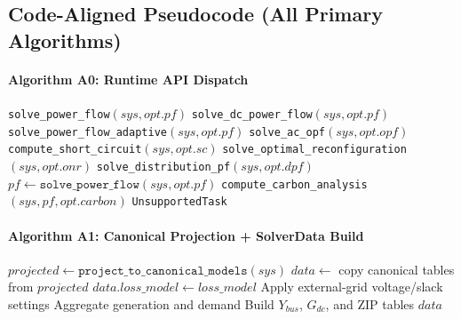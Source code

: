\subsection{Code-Aligned Pseudocode (All Primary Algorithms)}
\label{sec:algo-pseudocode}

\paragraph{Algorithm A0: Runtime API Dispatch}
\begin{algorithmic}[1]
    \State \Return \texttt{solve\_power\_flow}$(sys, opt.pf)$
    \State \Return \texttt{solve\_dc\_power\_flow}$(sys, opt.pf)$
    \State \Return \texttt{solve\_power\_flow\_adaptive}$(sys, opt.pf)$
    \State \Return \texttt{solve\_ac\_opf}$(sys, opt.opf)$
    \State \Return \texttt{compute\_short\_circuit}$(sys, opt.sc)$
    \State \Return \texttt{solve\_optimal\_reconfiguration}$(sys, opt.onr)$
    \State \Return \texttt{solve\_distribution\_pf}$(sys, opt.dpf)$
    \State $pf \gets \texttt{solve\_power\_flow}(sys, opt.pf)$
    \State \Return \texttt{compute\_carbon\_analysis}$(sys, pf, opt.carbon)$
  \Else
    \State \Return \texttt{UnsupportedTask}
  \EndIf
\EndProcedure
\end{algorithmic}

\paragraph{Algorithm A1: Canonical Projection + SolverData Build}
\begin{algorithmic}[1]
  \State $projected \gets \texttt{project\_to\_canonical\_models}(sys)$
  \Statex {}
  \State $data \gets$ copy canonical tables from $projected$
  \State $data.loss\_model \gets loss\_model$
  \State Apply external-grid voltage/slack settings
  \State Aggregate generation and demand
  \State Build \(Y_{bus}\), \(G_{dc}\), and ZIP tables
  \State \Return $data$
\EndProcedure
\end{algorithmic}

